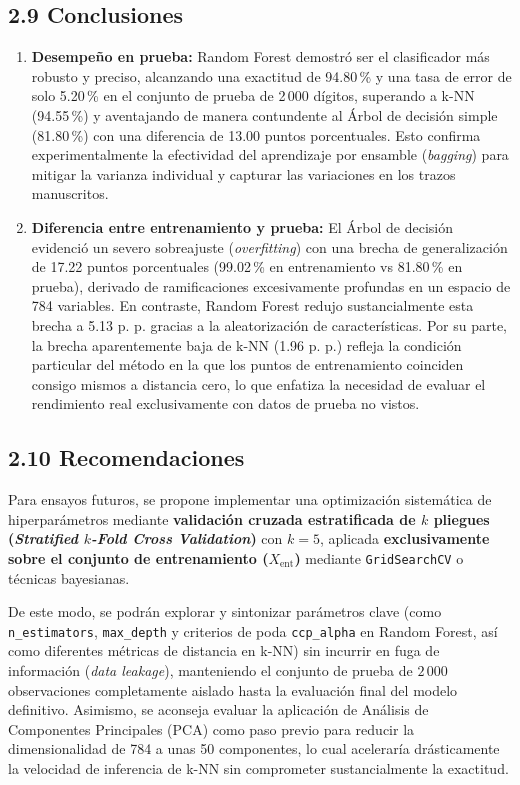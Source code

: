 \documentclass[11pt,a4paper]{article}
\begin{document}
\subsection*{2.9 Conclusiones}
\begin{enumerate}[leftmargin=*]
    \item \textbf{Desempeño en prueba:} Random Forest demostró ser el clasificador más robusto y preciso, alcanzando una exactitud de 94.80\,\% y una tasa de error de solo 5.20\,\% en el conjunto de prueba de 2\,000 dígitos, superando a k-NN (94.55\,\%) y aventajando de manera contundente al Árbol de decisión simple (81.80\,\%) con una diferencia de 13.00 puntos porcentuales. Esto confirma experimentalmente la efectividad del aprendizaje por ensamble (\textit{bagging}) para mitigar la varianza individual y capturar las variaciones en los trazos manuscritos.
    
    \item \textbf{Diferencia entre entrenamiento y prueba:} El Árbol de decisión evidenció un severo sobreajuste (\textit{overfitting}) con una brecha de generalización de 17.22 puntos porcentuales (99.02\,\% en entrenamiento vs 81.80\,\% en prueba), derivado de ramificaciones excesivamente profundas en un espacio de 784 variables. En contraste, Random Forest redujo sustancialmente esta brecha a 5.13 p. p. gracias a la aleatorización de características. Por su parte, la brecha aparentemente baja de k-NN (1.96 p. p.) refleja la condición particular del método en la que los puntos de entrenamiento coinciden consigo mismos a distancia cero, lo que enfatiza la necesidad de evaluar el rendimiento real exclusivamente con datos de prueba no vistos.
\end{enumerate}

\subsection*{2.10 Recomendaciones}
Para ensayos futuros, se propone implementar una optimización sistemática de hiperparámetros mediante \textbf{validación cruzada estratificada de $k$ pliegues (\textit{Stratified $k$-Fold Cross Validation})} con $k = 5$, aplicada \textbf{exclusivamente sobre el conjunto de entrenamiento ($X_{\text{ent}}$)} mediante \texttt{GridSearchCV} o técnicas bayesianas.

De este modo, se podrán explorar y sintonizar parámetros clave (como \texttt{n\_estimators}, \texttt{max\_depth} y criterios de poda \texttt{ccp\_alpha} en Random Forest, así como diferentes métricas de distancia en k-NN) sin incurrir en fuga de información (\textit{data leakage}), manteniendo el conjunto de prueba de $2\,000$ observaciones completamente aislado hasta la evaluación final del modelo definitivo. Asimismo, se aconseja evaluar la aplicación de Análisis de Componentes Principales (PCA) como paso previo para reducir la dimensionalidad de 784 a unas 50 componentes, lo cual aceleraría drásticamente la velocidad de inferencia de k-NN sin comprometer sustancialmente la exactitud.
\end{document}
